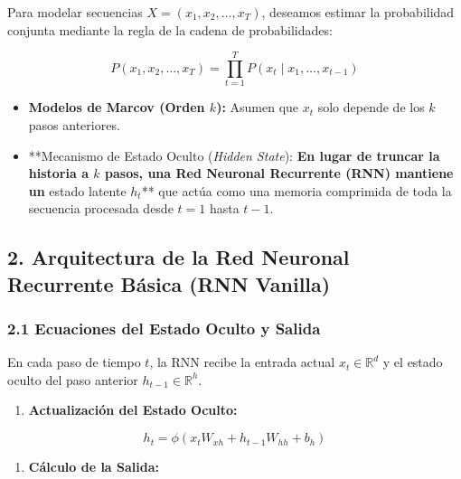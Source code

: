 \documentclass[11pt,oneside]{article}
\begin{document}
Para modelar secuencias \(X = (x_1, x_2, \dots, x_T)\), deseamos estimar la probabilidad conjunta mediante la regla de la cadena de probabilidades:

\[P(x_1, x_2, \dots, x_T) = \prod_{t=1}^{T} P(x_t \mid x_1, \dots, x_{t-1})\]

\begin{itemize}

\item \textbf{Modelos de Marcov (Orden \(k\)):} Asumen que \(x_t\) solo depende de los \(k\) pasos anteriores.

\end{itemize}

\begin{itemize}

\item **Mecanismo de Estado Oculto (\emph{Hidden State}):\textbf{ En lugar de truncar la historia a \(k\) pasos, una Red Neuronal Recurrente (RNN) mantiene un }estado latente \(h_t\)** que actúa como una memoria comprimida de toda la secuencia procesada desde \(t=1\) hasta \(t-1\).

\end{itemize}

\subsection{2. Arquitectura de la Red Neuronal Recurrente Básica (RNN Vanilla)}

\subsubsection{2.1 Ecuaciones del Estado Oculto y Salida}

En cada paso de tiempo \(t\), la RNN recibe la entrada actual \(x_t \in \mathbb{R}^d\) y el estado oculto del paso anterior \(h_{t-1} \in \mathbb{R}^h\).

\begin{enumerate}

\item \textbf{Actualización del Estado Oculto:}

\end{enumerate}

\[h_t = \phi\left(x_t W_{xh} + h_{t-1} W_{hh} + b_h\right)\]

\begin{enumerate}

\item \textbf{Cálculo de la Salida:}

\end{enumerate}
\end{document}
